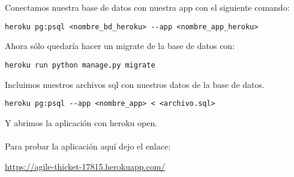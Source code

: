 Conectamos nuestra base de datos con nuestra app con el siguiente comando:
\begin{lstlisting}
heroku pg:psql <nombre_bd_heroku> --app <nombre_app_heroku>
\end{lstlisting}

Ahora sólo quedaría hacer un migrate de la base de datos con:
\begin{lstlisting}
heroku run python manage.py migrate
\end{lstlisting}

Incluimos nuestros archivos sql con nuestros datos de la base de datos.
\begin{lstlisting}
heroku pg:psql --app <nombre_app> < <archivo.sql>
\end{lstlisting}
Y abrimos la aplicación con heroku open.\\\\

Para probar la aplicación aquí dejo el enlace:

\url{https://agile-thicket-17815.herokuapp.com/}